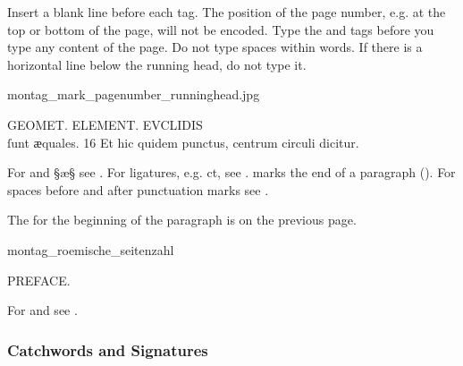 \begin{clarification}
Insert a blank line before each  tag.
The position of the page number, e.g. at the top or bottom of the page, will not be encoded. Type the  and  tags before you type any content of the page. Do not type spaces within words. If there is a horizontal line below the running head, do not type it.
\end{clarification}

\begin{sampleImage}{montag_mark_pagenumber_runninghead.jpg}
\begin{typeLatin}
 GEOMET. ELEMENT. EVCLIDIS \\
ſunt ӕquales. 16 Et hic quidem punctus, centrum circuli dicitur. \\
\untranscribedText
\end{typeLatin}
\end{sampleImage}

\begin{crossref}
For and §æ§ see . For ligatures, e.g. { ct}, see .  marks the end of a paragraph (). For spaces before and after punctuation marks see .
\end{crossref}

\begin{note}
The  for the beginning of the paragraph is on the previous page.
\end{note}

\vspace{3mm}
\begin{sampleImage}{montag_roemische_seitenzahl}
\begin{typeLatin}
 PREFACE.
\end{typeLatin}
\end{sampleImage}

\begin{crossref}
For  and  see .
\end{crossref}

\subsubsection{Catchwords and Signatures}
\label{section catchwords and signatures}

